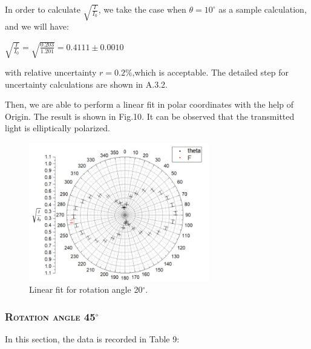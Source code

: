 \documentclass[a4paper,12pt]{article}
\begin{document}
In order to calculate $\displaystyle \sqrt{\frac{I}{I_0}}$, we take the case when $\theta = 10^{\circ}$ as a sample calculation, and we will have:
\begin{center}
$\displaystyle \sqrt{\frac{I}{I_0}} = \sqrt{\frac{0.203}{1.201}} = 0.4111 \pm 0.0010$
\end{center}

with relative uncertainty $\displaystyle r = 0.2\% $,which is acceptable. The detailed step for uncertainty calculations are shown in A.3.2.

\newpage
\par Then, we are able to perform a linear fit in polar coordinates with the help of Origin. The result is shown in Fig.10. It can be observed that the transmitted light is elliptically polarized.

\begin{figure}[htb] 
    \centering
    \includegraphics[width=0.7\textwidth]{p2n} 
    \caption{Linear fit for rotation angle 20$^{\circ}$.} 
\end{figure}
\newpage






\subsubsection{\textsc{Rotation angle 45$^\circ$}}
In this section, the data is recorded in Table 9:
\end{document}
